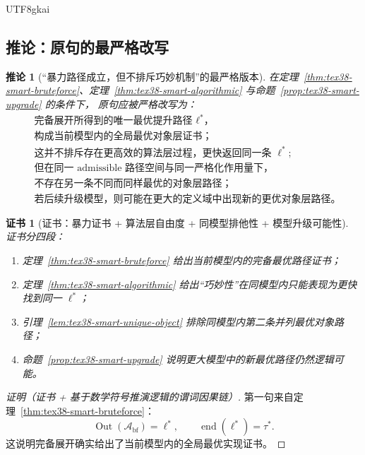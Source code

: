 \documentclass[12pt]{article}
\newtheorem{corollary}{推论}[section]
\newtheorem{Certificate}{证书}[section]
\begin{document}
\begin{CJK*}{UTF8}{gkai}
\subsection{推论：原句的最严格改写}
\label{subsec:tex38-smart-corollary}

\begin{corollary}[“暴力路径成立，但不排斥巧妙机制”的最严格版本]
\label{cor:tex38-smart-compatibility}
在定理~\ref{thm:tex38-smart-bruteforce}、定理~\ref{thm:tex38-smart-algorithmic} 与命题~\ref{prop:tex38-smart-upgrade} 的条件下，
原句应被严格改写为：
\[
  \begin{aligned}
    &\text{完备展开所得到的唯一最优提升路径 }\ell^\ast\text{，}\\
    &\text{构成当前模型内的全局最优对象层证书；}\\
    &\text{这并不排斥存在更高效的算法层过程，更快返回同一条 }\ell^\ast;\\
    &\text{但在同一 admissible 路径空间与同一严格化作用量下，}\\
    &\text{不存在另一条不同而同样最优的对象层路径；}\\
    &\text{若后续升级模型，则可能在更大的定义域中出现新的更优对象层路径。}
  \end{aligned}
\]
\end{corollary}

\begin{Certificate}[证书：暴力证书 + 算法层自由度 + 同模型排他性 + 模型升级可能性]
\label{cert:tex38-smart-compatibility}
证书分四段：
\begin{enumerate}
  \item 定理~\ref{thm:tex38-smart-bruteforce} 给出当前模型内的完备最优路径证书；
  \item 定理~\ref{thm:tex38-smart-algorithmic} 给出“巧妙性”在同模型内只能表现为更快找到同一 $\ell^\ast$；
  \item 引理~\ref{lem:tex38-smart-unique-object} 排除同模型内第二条并列最优对象路径；
  \item 命题~\ref{prop:tex38-smart-upgrade} 说明更大模型中的新最优路径仍然逻辑可能。
\end{enumerate}
\end{Certificate}

\begin{proof}[证明（证书 + 基于数学符号推演逻辑的谓词因果链）]
第一句来自定理~\ref{thm:tex38-smart-bruteforce}：
\[
  \operatorname{Out}(\mathcal A_{\mathrm{bf}})=\ell^\ast,
  \qquad
  \operatorname{end}(\ell^\ast)=\tau^\ast.
\]
这说明完备展开确实给出了当前模型内的全局最优实现证书。


\end{proof}
\end{CJK*}
\end{document}
